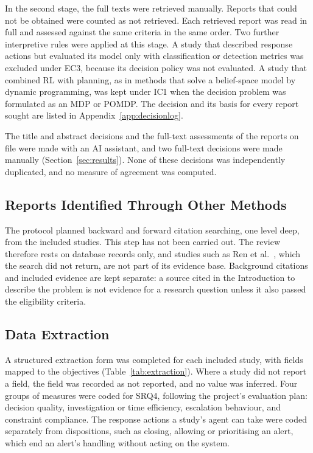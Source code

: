 In the second stage, the full texts were retrieved manually. Reports that could not be obtained were counted as not retrieved. Each retrieved report was read in full and assessed against the same criteria in the same order. Two further interpretive rules were applied at this stage. A study that described response actions but evaluated its model only with classification or detection metrics was excluded under EC3, because its decision policy was not evaluated. A study that combined RL with planning, as in methods that solve a belief-space model by dynamic programming, was kept under IC1 when the decision problem was formulated as an MDP or POMDP. The decision and its basis for every report sought are listed in Appendix~\ref{app:decisionlog}.

The title and abstract decisions and the full-text assessments of the reports on file were made with an AI assistant, and two full-text decisions were made manually (Section~\ref{sec:results}). None of these decisions was independently duplicated, and no measure of agreement was computed.

\subsection{Reports Identified Through Other Methods}
\label{sec:other}

The protocol planned backward and forward citation searching, one level deep, from the included studies. This step has not been carried out. The review therefore rests on database records only, and studies such as Ren et al.~\cite{ren2025}, which the search did not return, are not part of its evidence base. Background citations and included evidence are kept separate: a source cited in the Introduction to describe the problem is not evidence for a research question unless it also passed the eligibility criteria.

\subsection{Data Extraction}

A structured extraction form was completed for each included study, with fields mapped to the objectives (Table~\ref{tab:extraction}). Where a study did not report a field, the field was recorded as not reported, and no value was inferred. Four groups of measures were coded for SRQ4, following the project's evaluation plan: decision quality, investigation or time efficiency, escalation behaviour, and constraint compliance. The response actions a study's agent can take were coded separately from dispositions, such as closing, allowing or prioritising an alert, which end an alert's handling without acting on the system.

